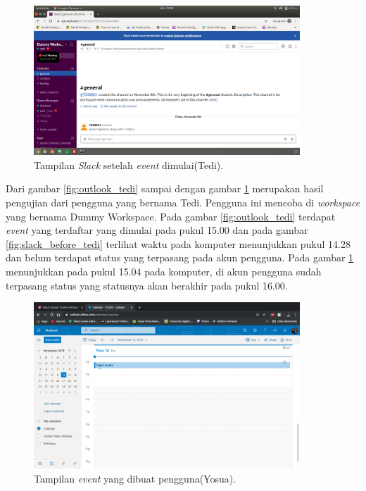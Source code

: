 \begin{figure}[h]
  \includegraphics[width=10cm]{./Gambar/PengujianTedi/Slack_After.png}
  \centering
  \caption{Tampilan \textit{Slack} setelah \textit{event} dimulai(Tedi).}
  \label{fig:slack_after_tedi}
\end{figure}

Dari gambar \ref{fig:outlook_tedi} sampai dengan gambar \ref{fig:slack_after_tedi} merupakan hasil pengujian dari pengguna yang bernama Tedi. Pengguna ini mencoba di \textit{workspace} yang bernama Dummy Workspace. Pada gambar \ref{fig:outlook_tedi} terdapat \textit{event} yang terdaftar yang dimulai pada pukul 15.00 dan pada gambar \ref{fig:slack_before_tedi} terlihat waktu pada komputer menunjukkan pukul 14.28 dan belum terdapat status yang terpasang pada akun pengguna. Pada gambar \ref{fig:slack_after_tedi} menunjukkan pada pukul 15.04 pada komputer, di akun pengguna sudah terpasang status yang statusnya akan berakhir pada pukul 16.00. 
\clearpage

\begin{figure}[h]
  \includegraphics[width=10cm]{./Gambar/PengujianYosua/Outlook.png}
  \centering
  \caption{Tampilan \textit{event} yang dibuat pengguna(Yosua).}
  \label{fig:outlook_yosua}
\end{figure}

